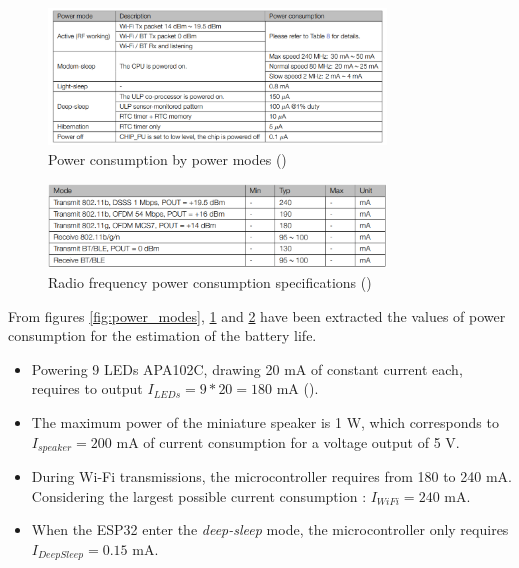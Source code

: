 \begin{figure}[H]
    \centering
    \includegraphics[width=0.8\textwidth]{images/EE_PowerConsumption.PNG}
    \caption{Power consumption by power modes (\cite{esp32datasheet})}
    \label{fig:power_consumption}
\end{figure}

\begin{figure}[H]
    \centering
    \includegraphics[width=0.8\textwidth]{images/EE_PowerConsumption2.PNG}
    \caption{Radio frequency power consumption specifications  (\cite{esp32datasheet})}
    \label{fig:power_consumption2}
\end{figure}

\newpage From figures \ref{fig:power_modes}, \ref{fig:power_consumption} and \ref{fig:power_consumption2} have been extracted the values of power consumption for the estimation of the battery life.

\begin{itemize}
    \item Powering 9 LEDs APA102C, drawing 20 mA of constant current each, requires to output $I_{LEDs} = 9*20 = 180$ mA (\cite{ledstripspec}).
    \item The maximum power of the miniature speaker is 1 W, which corresponds to $I_{speaker} = 200$ mA of current consumption for a voltage output of 5 V.
    \item During Wi-Fi transmissions, the microcontroller requires from 180 to 240 mA. Considering the largest possible current consumption : $I_{WiFi} = 240$ mA.
    \item When the ESP32 enter the \textit{deep-sleep} mode, the microcontroller only requires \\$I_{DeepSleep} = 0.15$ mA.
\end{itemize}

